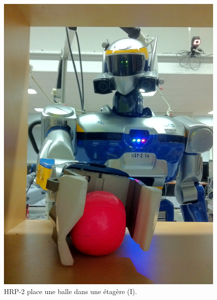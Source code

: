 \begin{figure}
  \begin{center}
    \includegraphics[width=.95\linewidth]{src/chap3-primitive-mouvement/demo1.jpg}
  \end{center}
  \caption{HRP-2 place une balle dans une étagère (I).}
\end{figure}

